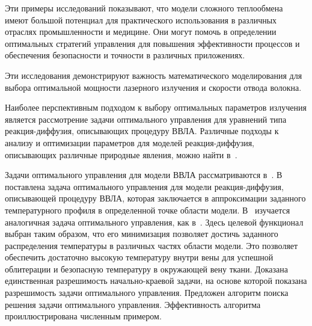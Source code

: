     Эти примеры исследований показывают, что модели сложного теплообмена имеют
    большой потенциал для практического использования в различных отраслях промышленности и медицине.
    Они могут помочь в определении оптимальных стратегий
    управления для повышения эффективности процессов
    и обеспечения безопасности и точности в различных приложениях.

%


    Эти исследования демонстрируют важность математического моделирования
    для выбора оптимальной мощности лазерного излучения и скорости отвода волокна.

    Наиболее перспективным подходом к выбору оптимальных параметров
    излучения является рассмотрение задачи оптимального управления
    для уравнений типа реакция-диффузия, описывающих процедуру ВВЛА\@.
    Различные подходы к анализу и оптимизации параметров для моделей реакция-диффузия,
    описывающих различные природные явления, можно найти в~\cite{
        Stability_Alekseev2016, Optimization_Brizitskii2018,
        chebotarev2018inverse, Theoretical_Maslovskaya2021}.

    Задачи оптимального управления для модели ВВЛА рассматриваются
    в~\cite{Optimal_Kovtanyuk2020, Inverse_Kovtanyuk2021}.
    В~\cite{Optimal_Kovtanyuk2020} поставлена задача оптимального управления для модели реакция-диффузия,
    описывающей процедуру ВВЛА, которая заключается в аппроксимации заданного
    температурного профиля в определенной точке области модели.
    В~\cite{Inverse_Kovtanyuk2021} изучается аналогичная задача оптимального управления,
    как в~\cite{Optimal_Kovtanyuk2020}.
    Здесь целевой функционал выбран таким образом, что его минимизация позволяет
    достичь заданного распределения температуры в различных частях области модели.
    Это позволяет обеспечить достаточно высокую температуру внутри
    вены для успешной облитерации и безопасную температуру в окружающей вену ткани.
    Доказана единственная разрешимость начально-краевой задачи,
    на основе которой показана разрешимость задачи оптимального управления.
    Предложен алгоритм поиска решения задачи оптимального управления.
    Эффективность алгоритма проиллюстрирована численным примером.


